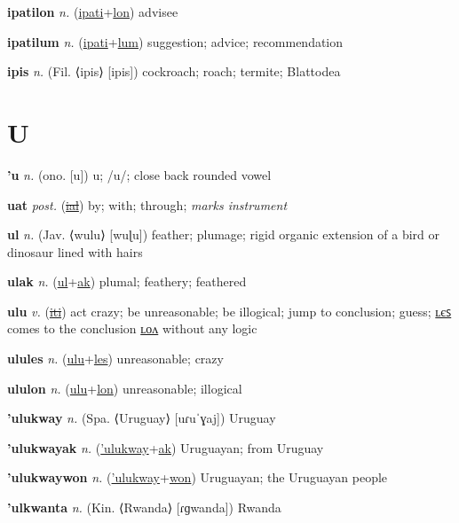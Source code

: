 \textbf{\hypertarget{ipatilon}{ipatilon}} \textit{n.} (\hyperlink{ipati}{ipati}+\allowbreak \hyperlink{lon}{lon})
advisee

\textbf{\hypertarget{ipatilum}{ipatilum}} \textit{n.} (\hyperlink{ipati}{ipati}+\allowbreak \hyperlink{lum}{lum})
suggestion; advice; recommendation

\textbf{\hypertarget{ipis}{ipis}} \textit{n.} (Fil. ⟨ipis⟩ [ipis])
cockroach; roach; termite; Blattodea

\section{U}

\textbf{\hypertarget{'u}{'u}} \textit{n.} (ono. [u])
u; /u/; close back rounded vowel

\textbf{\hypertarget{uat}{uat}} \textit{post.} (\hyperlink{ial}{\sout{ial}})
by; with; through; \textit{marks instrument}

\textbf{\hypertarget{ul}{ul}} \textit{n.} (Jav. ⟨wulu⟩ [wuɭu])
feather; plumage; rigid organic extension of a bird or dinosaur lined with hairs

\textbf{\hypertarget{ulak}{ulak}} \textit{n.} (\hyperlink{ul}{ul}+\allowbreak \hyperlink{ak}{ak})
plumal; feathery; feathered

\textbf{\hypertarget{ulu}{ulu}} \textit{v.} (\hyperlink{iti}{\sout{iti}})
act crazy; be unreasonable; be illogical; jump to conclusion; guess; \hyperlink{ulules}{ʟєꜱ} comes to the conclusion \hyperlink{ululon}{ʟᴏᴧ} without any logic

\textbf{\hypertarget{ulules}{ulules}} \textit{n.} (\hyperlink{ulu}{ulu}+\allowbreak \hyperlink{les}{les})
unreasonable; crazy

\textbf{\hypertarget{ululon}{ululon}} \textit{n.} (\hyperlink{ulu}{ulu}+\allowbreak \hyperlink{lon}{lon})
unreasonable; illogical

\textbf{\hypertarget{'ulukway}{'ulukway}} \textit{n.} (Spa. ⟨Uruguay⟩ [uɾuˈɣaj])
Uruguay

\textbf{\hypertarget{'ulukwayak}{'ulukwayak}} \textit{n.} (\hyperlink{'ulukway}{'ulukway}+\allowbreak \hyperlink{ak}{ak})
Uruguayan; from Uruguay

\textbf{\hypertarget{'ulukwaywon}{'ulukwaywon}} \textit{n.} (\hyperlink{'ulukway}{'ulukway}+\allowbreak \hyperlink{won}{won})
Uruguayan; the Uruguayan people

\textbf{\hypertarget{'ulkwanta}{'ulkwanta}} \textit{n.} (Kin. ⟨Rwanda⟩ [ɾɡwanda])
Rwanda

